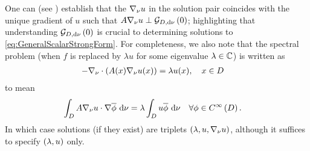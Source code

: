 One can (see \cite{zhikov2000extension}) establish that the $\nabla_\nu u$ in the solution pair coincides with the unique gradient of $u$ such that $A\nabla_\nu u \perp \mathcal{G}_{ D, \mathrm{d}\nu}\left( 0 \right)$; highlighting that understanding $\mathcal{G}_{ D, \mathrm{d}\nu}\left( 0 \right)$ is crucial to determining solutions to \eqref{eq:GeneralScalarStrongForm}.
For completeness, we also note that the spectral problem (when $f$ is replaced by $\lambda u$ for some eigenvalue $\lambda\in\mathbb{C}$) is written as
\begin{align*}
	-\nabla_\nu \cdot \left( A(x)\nabla_\nu u(x) \right) &= \lambda u(x), \quad x\in D
\end{align*}
to mean
\begin{align*}
	\int_{D}A\nabla_\nu u \cdot \nabla\overline{\phi} \ \mathrm{d}\nu &= \lambda\int_{D}u\overline{\phi} \ \mathrm{d}\nu \quad \forall \phi\in C^{\infty}\left( D \right).
\end{align*}
In which case solutions (if they exist) are triplets $\left( \lambda, u, \nabla_\nu u \right)$, although it suffices to specify $\left( \lambda, u \right)$ only. \newline

